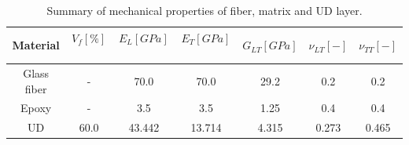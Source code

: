 \documentclass[review]{elsarticle}
\begin{document}

\begin{table}[!h]
 \centering
 \caption{Summary of mechanical properties of fiber, matrix and UD layer.}%
 \begin{tabular}{ccccccc}
\textbf{Material} & \textbf{$V_{f}\left[\%\right]$}\  & \textbf{$E_{L}\left[GPa\right]$}\ & \textbf{$E_{T}\left[GPa\right]$}\  & \textbf{$G_{LT}\left[GPa\right]$} &\textbf{$\nu_{LT}\left[-\right]$} & \textbf{$\nu_{TT}\left[-\right]$} \\
\midrule
Glass fiber &-   & 70.0 & 70.0  & 29.2 & 0.2  & 0.2\\
Epoxy    &-& 3.5 & 3.5   & 1.25 &  0.4& 0.4\\
UD&60.0&43.442&13.714& 4.315& 0.273&0.465\\
\end{tabular}
\label{tab:phaseprop}
\end{table}
\end{document}
